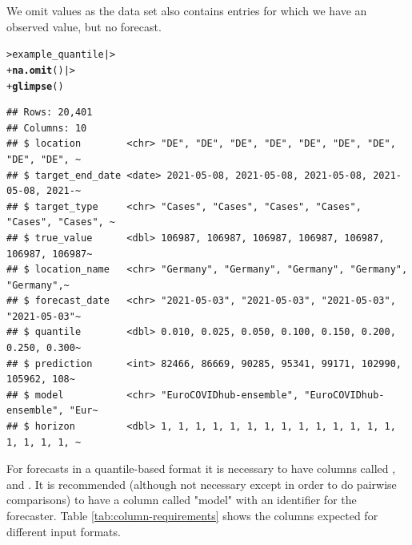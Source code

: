 \documentclass[article,shortnames]{jss}\usepackage[]{graphicx}\usepackage[]{color}
\makeatletter
\newcommand{\hlstd}[1]{\textcolor[rgb]{0.345,0.345,0.345}{#1}}%
\newcommand{\hlkwd}[1]{\textcolor[rgb]{0.737,0.353,0.396}{\textbf{#1}}}%
\newenvironment{kframe}{%
 \def\at@end@of@kframe{}%
 \ifinner\ifhmode%
  \def\at@end@of@kframe{\end{minipage}}%
  \begin{minipage}{\columnwidth}%
 \fi\fi%
 \def\FrameCommand##1{\hskip\@totalleftmargin \hskip-\fboxsep
 \colorbox{shadecolor}{##1}\hskip-\fboxsep
     \hskip-\linewidth \hskip-\@totalleftmargin \hskip\columnwidth}%
 \MakeFramed {\advance\hsize-\width
   \@totalleftmargin\z@ \linewidth\hsize
   \@setminipage}}%
 {\par\unskip\endMakeFramed%
 \at@end@of@kframe}
\newenvironment{knitrout}{}{} %
\makeatother
\begin{document}
We omit  values as the data set also contains entries for which we have an observed value, but no forecast. 
% 
\begin{knitrout}
\color{fgcolor}\begin{kframe}
\begin{alltt}
\hlstd{> }\hlstd{example_quantile |>}
\hlstd{+ }    \hlkwd{na.omit}\hlstd{() |>}
\hlstd{+ }    \hlkwd{glimpse}\hlstd{()}
\end{alltt}
\begin{verbatim}
## Rows: 20,401
## Columns: 10
## $ location        <chr> "DE", "DE", "DE", "DE", "DE", "DE", "DE", "DE", "DE", ~
## $ target_end_date <date> 2021-05-08, 2021-05-08, 2021-05-08, 2021-05-08, 2021-~
## $ target_type     <chr> "Cases", "Cases", "Cases", "Cases", "Cases", "Cases", ~
## $ true_value      <dbl> 106987, 106987, 106987, 106987, 106987, 106987, 106987~
## $ location_name   <chr> "Germany", "Germany", "Germany", "Germany", "Germany",~
## $ forecast_date   <chr> "2021-05-03", "2021-05-03", "2021-05-03", "2021-05-03"~
## $ quantile        <dbl> 0.010, 0.025, 0.050, 0.100, 0.150, 0.200, 0.250, 0.300~
## $ prediction      <int> 82466, 86669, 90285, 95341, 99171, 102990, 105962, 108~
## $ model           <chr> "EuroCOVIDhub-ensemble", "EuroCOVIDhub-ensemble", "Eur~
## $ horizon         <dbl> 1, 1, 1, 1, 1, 1, 1, 1, 1, 1, 1, 1, 1, 1, 1, 1, 1, 1, ~
\end{verbatim}
\end{kframe}
\end{knitrout}
% 

For forecasts in a quantile-based format it is necessary to have columns called ,  and . It is recommended (although not necessary except in order to do pairwise comparisons) to have a column called "model" with an identifier for the forecaster.
Table \ref{tab:column-requirements} shows the columns expected for different input formats. 
\end{document}
